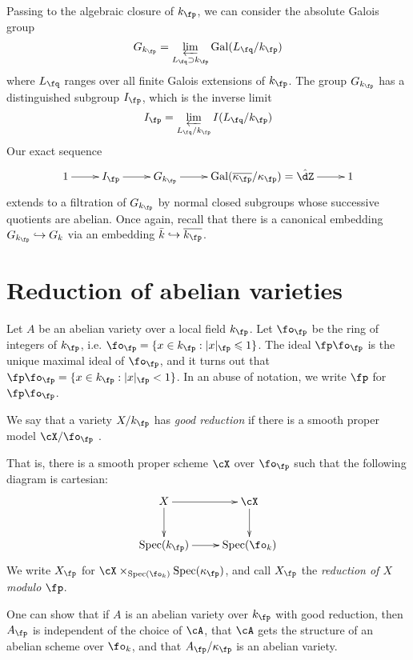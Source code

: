 \documentclass{article}
\begin{document}
Passing to the algebraic closure of $k_\fp$, we can consider the absolute 
Galois group 
\[
  G_{k_\fp} = \varprojlim_{L_\fq\supset k_\fp} \gal(L_\fq/k_\fp)
\]
where $L_\fq$ ranges over all finite Galois extensions of $k_\fp$. The group 
$G_{k_\fp}$ has a distinguished subgroup $I_\fp$, which is the inverse limit 
\[
  I_\fp = \varprojlim_{L_\fq/k_\fp} I(L_\fq/k_\fp)
\]
Our exact sequence 
\[\xymatrix{
  1 \ar[r] 
    & I_\fp \ar[r] 
    & G_{k_\fp} \ar[r] 
    & \gal(\overline{\kappa_\fp}/\kappa_\fp) =\hat\dZ \ar[r] 
    & 1
}\]
extends to a filtration of $G_{k_\fp}$ by normal closed subgroups whose 
successive quotients are abelian. Once again, recall that there is a canonical 
embedding $G_{k_\fp}\hookrightarrow G_k$ via an embedding 
$\bar k\hookrightarrow \overline{k_\fp}$. 










\section{Reduction of abelian varieties}

Let $A$ be an abelian variety over a local field $k_\fp$. Let $\fo_\fp$ be the 
ring of integers of $k_\fp$, i.e. $\fo_\fp=\{x\in k_\fp:|x|_\fp\leqslant 1\}$. 
The ideal $\fp\fo_\fp$ is the unique maximal ideal of $\fo_\fp$, and it turns 
out that $\fp\fo_\fp = \{x\in k_\fp:|x|_\fp<1\}$. In an abuse of notation, we 
write $\fp$ for $\fp\fo_\fp$. 

\begin{definition}
We say that a variety $X/k_\fp$ has \emph{good reduction} if there is a smooth 
proper model $\cX/\fo_\fp$ .
\end{definition}
That is, there is a smooth proper scheme $\cX$ over $\fo_\fp$ such that the 
following diagram is cartesian:
\[\xymatrix{
  X \ar[r] \ar[d]  
    & \cX \ar[d] \\
  \spec(k_\fp) \ar[r] 
    & \spec(\fo_k)
}\]
We write $X_\fp$ for $\cX\times_{\spec(\fo_k)}\spec(\kappa_\fp)$, and call 
$X_\fp$ the \emph{reduction of $X$ modulo $\fp$}. 

One can show that if $A$ is an abelian variety over $k_\fp$ with good 
reduction, then $A_\fp$ is independent of the choice of $\cA$, that $\cA$ gets 
the structure of an abelian scheme over $\fo_k$, and that $A_\fp/\kappa_\fp$ is 
an abelian variety. 
\end{document}
